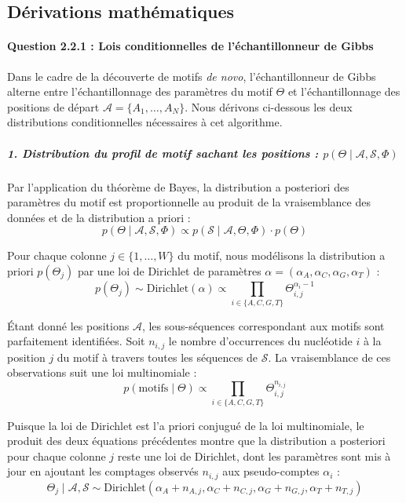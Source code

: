 \subsection{Dérivations mathématiques}
\paragraph{Question 2.2.1 : Lois conditionnelles de l'échantillonneur de Gibbs}

Dans le cadre de la découverte de motifs \textit{de novo}, l'échantillonneur de Gibbs 
alterne entre l'échantillonnage des paramètres du motif $\Theta$ et l'échantillonnage 
des positions de départ $\mathcal{A} = \{A_1, \dots, A_N\}$. Nous dérivons ci-dessous 
les deux distributions conditionnelles nécessaires à cet algorithme.

\subparagraph{1. Distribution du profil de motif sachant les positions : $p(\Theta \mid \mathcal{A}, \mathcal{S}, \Phi)$}

Par l'application du théorème de Bayes, la distribution a posteriori des paramètres du 
motif est proportionnelle au produit de la vraisemblance des données et de la 
distribution a priori :
\begin{equation}
    p(\Theta \mid \mathcal{A}, \mathcal{S}, \Phi) \propto p(\mathcal{S} \mid \mathcal{A}, \Theta, \Phi) \cdot p(\Theta)
\end{equation}

Pour chaque colonne $j \in \{1, \dots, W\}$ du motif, nous modélisons la 
distribution a priori $p(\Theta_j)$ par une loi de Dirichlet de paramètres 
$\alpha = (\alpha_A, \alpha_C, \alpha_G, \alpha_T)$ :
\begin{equation}
    p(\Theta_j) \sim \text{Dirichlet}(\alpha) \propto \prod_{i \in \{A,C,G,T\}} \Theta_{i,j}^{\alpha_i - 1}
\end{equation}

Étant donné les positions $\mathcal{A}$, les sous-séquences correspondant 
aux motifs sont parfaitement identifiées. Soit $n_{i,j}$ le nombre d'occurrences du 
nucléotide $i$ à la position $j$ du motif à travers toutes les séquences de 
$\mathcal{S}$. La vraisemblance de ces observations suit une loi multinomiale :
\begin{equation}
    p(\text{motifs} \mid \Theta) \propto \prod_{i \in \{A,C,G,T\}} \Theta_{i,j}^{n_{i,j}}
\end{equation}

Puisque la loi de Dirichlet est l'a priori conjugué de la loi multinomiale, 
le produit des deux équations précédentes montre que la distribution a posteriori pour 
chaque colonne $j$ reste une loi de Dirichlet, dont les paramètres sont mis à jour en 
ajoutant les comptages observés $n_{i,j}$ aux pseudo-comptes $\alpha_i$ :
\begin{equation}
    \Theta_j \mid \mathcal{A}, \mathcal{S} \sim \text{Dirichlet}(\alpha_A + n_{A,j}, \alpha_C + n_{C,j}, \alpha_G + n_{G,j}, \alpha_T + n_{T,j})
\end{equation}

